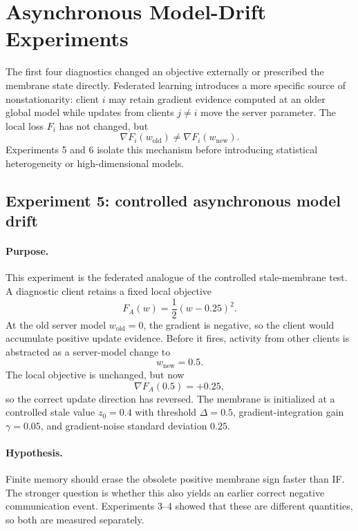 \section{Asynchronous Model-Drift Experiments}

The first four diagnostics changed an objective externally or prescribed the membrane state directly. Federated learning introduces a more specific source of nonstationarity: client $i$ may retain gradient evidence computed at an older global model while updates from clients $j\neq i$ move the server parameter. The local loss $F_i$ has not changed, but
\begin{equation}
  \nabla F_i(w_{\mathrm{old}})\neq \nabla F_i(w_{\mathrm{new}}).
\end{equation}
Experiments 5 and 6 isolate this mechanism before introducing statistical heterogeneity or high-dimensional models.

\subsection{Experiment 5: controlled asynchronous model drift}

\paragraph{Purpose.}
This experiment is the federated analogue of the controlled stale-membrane test. A diagnostic client retains a fixed local objective
\begin{equation}
  F_A(w)=\frac12(w-0.25)^2.
\end{equation}
At the old server model $w_{\mathrm{old}}=0$, the gradient is negative, so the client would accumulate positive update evidence. Before it fires, activity from other clients is abstracted as a server-model change to
\begin{equation}
  w_{\mathrm{new}}=0.5.
\end{equation}
The local objective is unchanged, but now
\begin{equation}
  \nabla F_A(0.5)=+0.25,
\end{equation}
so the correct update direction has reversed. The membrane is initialized at a controlled stale value $z_0=0.4$ with threshold $\Delta=0.5$, gradient-integration gain $\gamma=0.05$, and gradient-noise standard deviation $0.25$.

\paragraph{Hypothesis.}
Finite memory should erase the obsolete positive membrane sign faster than IF. The stronger question is whether this also yields an earlier correct negative communication event. Experiments 3--4 showed that these are different quantities, so both are measured separately.

